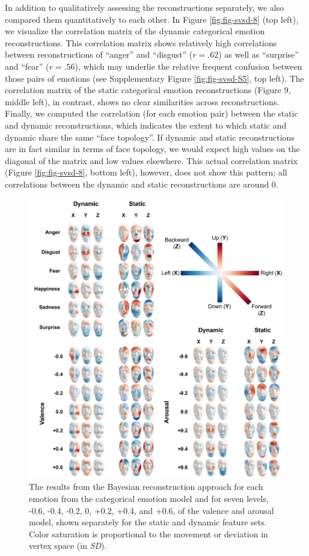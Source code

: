 \documentclass[11pt,american,a4paper,oneside,]{memoir} %
\begin{document}
In addition to qualitatively assessing the reconstructions separately, we also compared them quantitatively to each other. In Figure \ref{fig:fig-svsd-8} (top left), we visualize the correlation matrix of the dynamic categorical emotion reconstructions. This correlation matrix shows relatively high correlations between reconstructions of ``anger'' and ``disgust'' (\(r = .62\)) as well as ``surprise'' and ``fear'' (\(r = .56\)), which may underlie the relative frequent confusion between those pairs of emotions (see Supplementary Figure \ref{fig:fig-svsd-S5}, top left). The correlation matrix of the static categorical emotion reconstructions (Figure 9, middle left), in contrast, shows no clear similarities across reconstructions. Finally, we computed the correlation (for each emotion pair) between the static and dynamic reconstructions, which indicates the extent to which static and dynamic share the same ``face topology''. If dynamic and static reconstructions are in fact similar in terms of face topology, we would expect high values on the diagonal of the matrix and low values elsewhere. This actual correlation matrix (Figure \ref{fig:fig-svsd-8}, bottom left), however, does not show this pattern; all correlations between the dynamic and static reconstructions are around 0.

\begin{figure}
\centering
\includegraphics{_bookdown_files/static-vs-dynamic-files/figures/figure_7.pdf}
\caption{\label{fig:fig-svsd-7}The results from the Bayesian reconstruction approach for each emotion from the categorical emotion model and for seven levels, -0.6, -0.4, -0.2, 0, +0.2, +0.4, and +0.6, of the valence and arousal model, shown separately for the static and dynamic feature sets. Color saturation is proportional to the movement or deviation in vertex space (in \emph{SD}).}
\end{figure}
\end{document}
